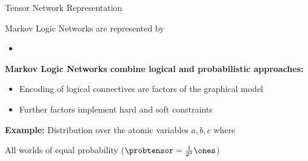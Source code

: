 \documentclass{beamer}
\begin{document}
%
%
%	
%




\begin{frame}{Tensor Network Representation}


Markov Logic Networks are represented by
\begin{itemize}
	\item 
\end{itemize}

\textbf{Markov Logic Networks combine logical and probabilistic approaches:}
\begin{itemize}
	\item Encoding of logical connectives are factors of the graphical model
	\item Further factors implement hard and soft constraints
\end{itemize}

\medskip

\textbf{Example:} Distribution over the atomic variables $a,b,c$ where
\begin{itemize}
	 {\item All worlds of equal probability ($\probtensor=\frac{1}{2^3}\ones$)}
\end{itemize}

\begin{center}
	
\end{center}


\end{frame}
\end{document}
